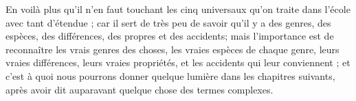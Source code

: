 En voilà plus qu'il n'en faut touchant les cinq universaux qu'on traite dans l'école avec tant d'étendue ; car il sert de très peu de savoir qu'il y a des genres, des espèces, des différences, des propres et des accidents; mais l'importance est de reconnaître les vrais genres des choses, les vraies espèces de chaque genre, leurs vraies différences, leurs vraies propriétés, et les accidents qui leur conviennent ; et c'est à quoi nous pourrons donner quelque lumière dans les chapitres suivants, après avoir dit auparavant quelque chose des termes complexes.
